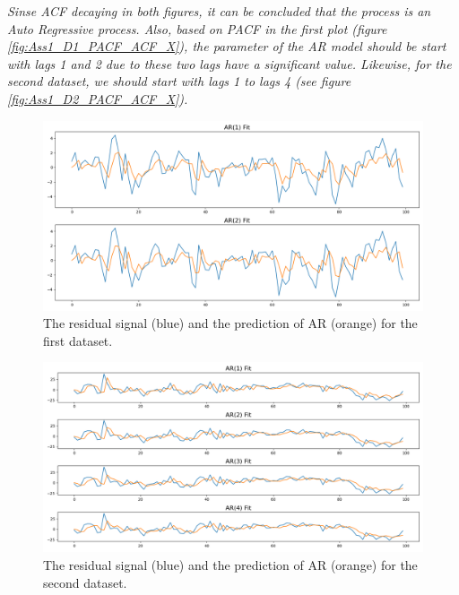 \textit{Sinse \gls{ACF} decaying in both figures, it can be concluded that the process is an Auto Regressive process. Also, based on \gls{PACF} in the first plot (figure \ref{fig:Ass1_D1_PACF_ACF_X}), the parameter of the \gls{AR} model should be start with lags 1 and 2 due to these two lags have a significant value. Likewise, for the second dataset, we should start with lags 1 to lags 4 (see figure \ref{fig:Ass1_D2_PACF_ACF_X}).}

\begin{figure}[H]
    \centering
    \begin{minipage}[b]{1\textwidth}
        \includegraphics[width=\textwidth]{figures/Ass1/Ass1_D1_ARs models.png}
    \end{minipage}
    \caption{The residual signal (blue) and the prediction of \gls{AR} (orange) for the first dataset.}
    \label{fig:Ass1_D1_ARs_models}
\end{figure}

\begin{figure}[H]
    \centering
    \begin{minipage}[b]{1\textwidth}
        \includegraphics[width=\textwidth]{figures/Ass1/Ass1_D2_ARs models.png}
    \end{minipage}
    \caption{The residual signal (blue) and the prediction of \gls{AR} (orange) for the second dataset.}
    \label{fig:Ass1_D2_ARs_models}
\end{figure}


